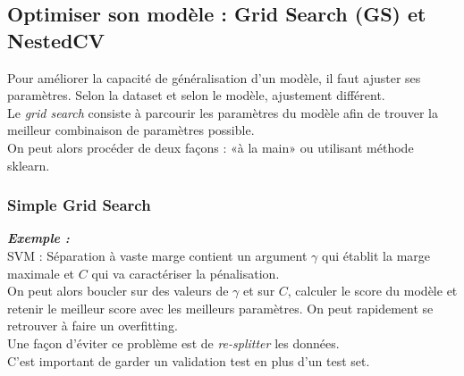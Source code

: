 \documentclass[a4paper,12pt]{report}
\newcommand\bk{\color{black}}
\newcommand\brick{\color{brick}}
\numberwithin{equation}{section} %
\begin{document}
\brick \subsection{Optimiser son modèle : Grid Search (GS) et NestedCV} \bk
Pour améliorer la capacité de généralisation d'un modèle, il faut ajuster ses paramètres. Selon la dataset et selon le modèle, ajustement différent.\\
Le \textit{grid search} consiste à parcourir les paramètres du modèle afin de trouver la meilleur combinaison de paramètres possible. \\
On peut alors procéder de deux façons : «à la main» ou utilisant méthode sklearn.
\subsubsection{Simple Grid Search}
\noindent \color{green!40!black!70} \textbf{\textit{Exemple :}} \bk \\
SVM : Séparation à vaste marge contient un argument $\gamma$ qui établit la marge maximale et $C$ qui va caractériser la pénalisation.\\
On peut alors boucler sur des valeurs de $\gamma$ et sur $C$, calculer le score du modèle et retenir le meilleur score avec les meilleurs paramètres. On peut rapidement se retrouver à faire un overfitting.\\
Une façon d'éviter ce problème est de \textit{re-splitter} les données. \\
C'est important de garder un validation test en plus d'un test set.\\
\end{document}

